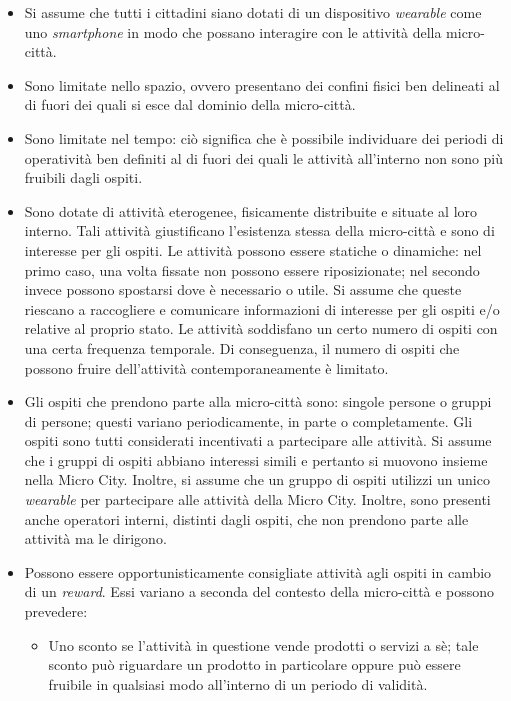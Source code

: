 \begin{itemize}
    \item Si assume che tutti i cittadini siano dotati di un dispositivo \textit{wearable} come uno \textit{smartphone} in modo che possano interagire con le attività della micro-città.
    \item Sono limitate nello spazio, ovvero presentano dei confini fisici ben delineati al di fuori dei quali si esce dal dominio della micro-città.
    \item Sono limitate nel tempo: ciò significa che è possibile individuare dei periodi di operatività ben definiti al di fuori dei quali le attività all'interno non sono più fruibili dagli ospiti.
    \item Sono dotate di attività eterogenee, fisicamente distribuite e situate al loro interno. Tali attività giustificano l'esistenza stessa della micro-città e sono di interesse per gli ospiti. Le attività possono essere statiche o dinamiche: nel primo caso, una volta fissate non possono essere riposizionate; nel secondo invece possono spostarsi dove è necessario o utile. Si assume che queste riescano a raccogliere e comunicare informazioni di interesse per gli ospiti e/o relative al proprio stato.
    Le attività soddisfano un certo numero di ospiti con una certa frequenza temporale. Di conseguenza, il numero di ospiti che possono fruire dell'attività contemporaneamente è limitato.
    \item Gli ospiti che prendono parte alla micro-città sono: singole persone o gruppi di persone; questi variano periodicamente, in parte o completamente. Gli ospiti sono tutti considerati incentivati a partecipare alle attività.
    Si assume che i gruppi di ospiti abbiano interessi simili e pertanto si muovono insieme nella Micro City. Inoltre, si assume che un gruppo di ospiti utilizzi un unico \textit{wearable} per partecipare alle attività della Micro City.
    Inoltre, sono presenti anche operatori interni, distinti dagli ospiti, che non prendono parte alle attività ma le dirigono.
    \item Possono essere opportunisticamente consigliate  attività agli ospiti in cambio di un \textit{reward}. Essi variano a seconda del contesto della micro-città e possono prevedere:
    \begin{itemize}
        \item Uno sconto se l'attività in questione vende prodotti o servizi a sè; tale sconto può riguardare un prodotto in particolare oppure può essere fruibile in qualsiasi modo all'interno di un periodo di validità.

\end{itemize}
\end{itemize}
